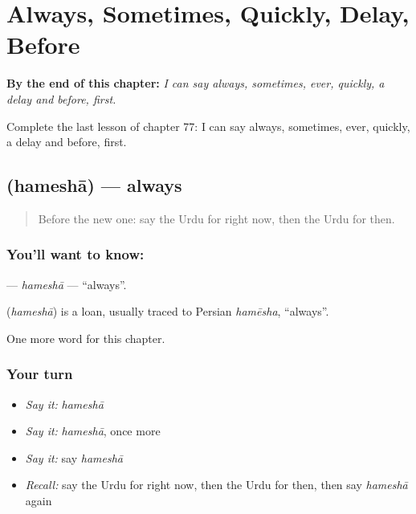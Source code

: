 
\chapter{Always, Sometimes, Quickly, Delay, Before}
\label{ch:ur-always-sometimes-quickly-delay-before}

\begin{chapteropening}
\textbf{By the end of this chapter:} \emph{I can say always, sometimes, ever, quickly, a delay and before, first.}

Complete the last lesson of chapter 77: I can say always, sometimes, ever, quickly, a delay and before, first.
\end{chapteropening}

\section[\texorpdfstring{\ur{ہمیشہ} (hameshā)}{ہمیشہ (hameshā)}]{ (hameshā) — always}

\label{lesson:UR-C77-hamesha}



\begin{quote}
Before the new one: say the Urdu for right now, then the Urdu for then.
\end{quote}

\subsection*{You'll want to know: }
\textbf{} — \emph{hameshā} — \textquotedblleft{}always\textquotedblright{}.

\begin{cousinweb}
\textbf{} (\emph{hameshā}) is a loan, usually traced to Persian \emph{hamēsha}, \textquotedblleft{}always\textquotedblright{}.
\end{cousinweb}

\begin{grammarlens}[title={What you've built}]
One more word for this chapter.
\end{grammarlens}

\subsection*{Your turn}
\begin{itemize}
\raggedright
  \item \emph{Say it:} \emph{hameshā}
  \item \emph{Say it:} \emph{hameshā}, once more
  \item \emph{Say it:} say \emph{hameshā}
  \item \emph{Recall:} say the Urdu for right now, then the Urdu for then, then say \emph{hameshā} again
\end{itemize}

